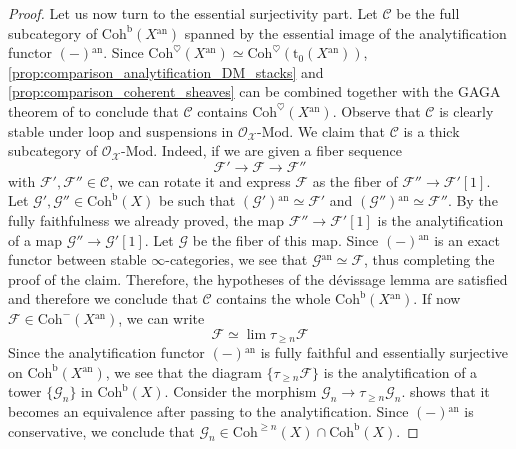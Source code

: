 \documentclass[12pt,a4paper,reqno]{amsart}
\theoremstyle{plain}
\theoremstyle{definition}
\theoremstyle{remark}
\numberwithin{equation}{section}
\begin{document}
\begin{proof}
	Let us now turn to the essential surjectivity part. Let ${\mathcal C}$ be the full subcategory of ${\mathrm{Coh}^{\mathrm{b}}}(X{^\mathrm{an}})$ spanned by the essential image of the analytification functor $(-){^\mathrm{an}}$. Since ${\mathrm{Coh}}^\heartsuit(X{^\mathrm{an}}) \simeq {\mathrm{Coh}}^\heartsuit({\mathrm{t}_0}(X{^\mathrm{an}}))$, \cref{prop:comparison_analytification_DM_stacks} and \cref{prop:comparison_coherent_sheaves} can be combined together with the GAGA theorem of \cite[Theorem 7.3]{Porta_Yu_Higher_analytic_stacks_2014} to conclude that ${\mathcal C}$ contains ${\mathrm{Coh}}^\heartsuit(X{^\mathrm{an}})$.
	Observe that ${\mathcal C}$ is clearly stable under loop and suspensions in ${\mathcal O}_{\mathcal X} \textrm{-} {\mathrm{Mod}}$.
	We claim that ${\mathcal C}$ is a thick subcategory of ${\mathcal O}_{\mathcal X} \textrm{-} {\mathrm{Mod}}$.
	Indeed, if we are given a fiber sequence
	\[ {\mathcal F}' \to {\mathcal F} \to {\mathcal F}'' \]
	with ${\mathcal F}', {\mathcal F}'' \in {\mathcal C}$, we can rotate it and express ${\mathcal F}$ as the fiber of ${\mathcal F}'' \to {\mathcal F}'[1]$.
	Let ${\mathcal G}', {\mathcal G}'' \in {\mathrm{Coh}^{\mathrm{b}}}(X)$ be such that $({\mathcal G}'){^\mathrm{an}} \simeq {\mathcal F}'$ and $({\mathcal G}''){^\mathrm{an}} \simeq {\mathcal F}''$.
	By the fully faithfulness we already proved, the map ${\mathcal F}'' \to {\mathcal F}'[1]$ is the analytification of a map ${\mathcal G}'' \to {\mathcal G}'[1]$.
	Let ${\mathcal G}$ be the fiber of this map.
	Since $(-){^\mathrm{an}}$ is an exact functor between stable $\infty$-categories, we see that ${\mathcal G}{^\mathrm{an}} \simeq {\mathcal F}$, thus completing the proof of the claim.
	Therefore, the hypotheses of the d\'evissage lemma \cite[Lemma 5.10]{Porta_Yu_Higher_analytic_stacks_2014} are satisfied and therefore we conclude that ${\mathcal C}$ contains the whole ${\mathrm{Coh}^{\mathrm{b}}}(X{^\mathrm{an}})$.
	If now ${\mathcal F} \in {\mathrm{Coh}}^-(X{^\mathrm{an}})$, we can write
	\[ {\mathcal F} \simeq \lim \tau_{\ge n} {\mathcal F} \]
	Since the analytification functor $(-){^\mathrm{an}}$ is fully faithful and essentially surjective on ${\mathrm{Coh}^{\mathrm{b}}}(X{^\mathrm{an}})$, we see that the diagram $\{\tau_{\ge n} {\mathcal F}\}$ is the analytification of a tower $\{{\mathcal G}_n\}$ in ${\mathrm{Coh}^{\mathrm{b}}}(X)$.
	Consider the morphism ${\mathcal G}_n \to \tau_{\ge n} {\mathcal G}_n$.
	 shows that it becomes an equivalence after passing to the analytification.
	Since $(-){^\mathrm{an}}$ is conservative, we conclude that ${\mathcal G}_n \in {\mathrm{Coh}}^{\ge n}(X) \cap {\mathrm{Coh}^{\mathrm{b}}}(X)$.

\end{proof}
\end{document}

